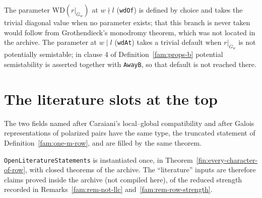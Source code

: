 \begin{remark}\label{fam:rem-wd-default}
The parameter $\mathrm{WD}(r|_{G_w})$ at $w\nmid l$ (\texttt{wdOf}) is defined by choice and takes the trivial diagonal value when no parameter exists; that this branch is never taken would follow from Grothendieck's monodromy theorem, which was not located in the archive. The parameter at $w\mid l$ (\texttt{wdAt}) takes a trivial default when $r|_{G_w}$ is not potentially semistable; in clause 4 of Definition~\ref{fam:props-b} potential semistability is asserted together with \texttt{AwayB}, so that default is not reached there.
\end{remark}

\section{The literature slots at the top}



\begin{remark}\label{fam:rem-row-dup}
The two fields named after Caraiani's local--global compatibility and after Galois representations of polarized pairs have the same type, the truncated statement of Definition~\ref{fam:one-m-row}, and are filled by the same theorem.
\end{remark}







\begin{remark}\label{fam:rem-open-lit}
\texttt{OpenLiteratureStatements} is instantiated once, in Theorem~\ref{fin:every-character-of-row}, with closed theorems of the archive. The ``literature'' inputs are therefore claims proved inside the archive (not compiled here), of the reduced strength recorded in Remarks~\ref{fam:rem-not-llc} and~\ref{fam:rem-row-strength}.
\end{remark}
